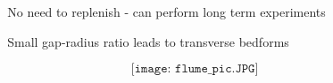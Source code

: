 \documentclass{beamer}
\begin{document}
\begin{frame}
\begin{columns}[t]
\begin{column}{0.5\paperwidth}
    \end{column}

    \begin{column}{0.5\paperwidth}

      \centering

      No need to replenish - can perform long term experiments

      \vspace{1cm}

      Small gap-radius ratio leads to transverse bedforms

      \vspace{-1cm}

      \begin{figure}
        $$\texttt{[image: flume\_pic.JPG]}$$
      \end{figure}

    \end{column}

  \end{columns}
\end{frame}
\end{document}
